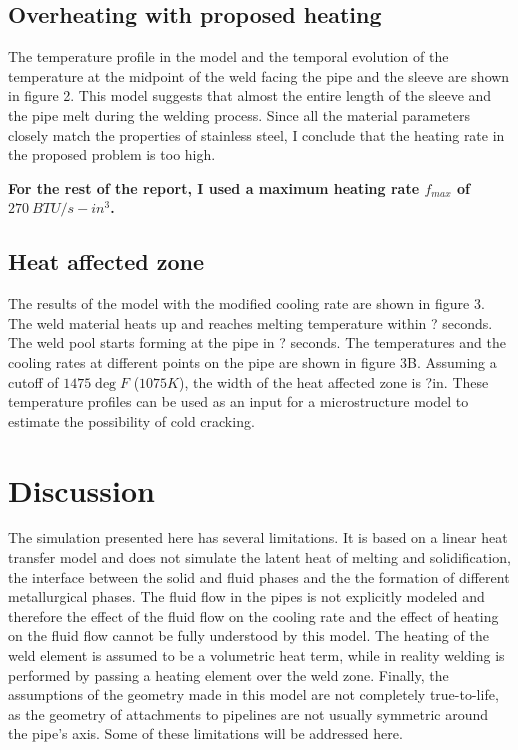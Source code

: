 \documentclass{article}
\makeatletter
\newcommand{\autocitel}[1]{\autocite{#1}\checknextarg}
\newcommand{\checknextarg}{\@ifnextchar\bgroup{\gobblenextarg}{}}
\newcommand{\gobblenextarg}[1]{$^,$\autocite{#1}\@ifnextchar\bgroup{\gobblenextarg}{}}
\makeatother
\begin{document}
\subsection{Overheating with proposed heating}
	The temperature profile in the model and the temporal evolution of the temperature at the midpoint of the weld facing the pipe and the sleeve are shown in figure 2. This model suggests that almost the entire length of the sleeve and the pipe melt during the welding process. Since all the material parameters closely match the properties of stainless steel, I conclude that the heating rate in the proposed problem is too high. 

\textbf{For the rest of the report, I used a maximum heating rate $f_{max}$ of $270~ BTU/s-in^3$.}

\subsection{Heat affected zone}
	The results of the model with the modified cooling rate are shown in figure 3. The weld material heats up and reaches melting temperature within ? seconds. The weld pool starts forming at the pipe in ? seconds. The temperatures and the cooling rates at different points on the pipe are shown in figure 3B. Assuming a cutoff of $1475 \deg F$ ($1075 K$)\autocitel{cheng2004weld}, the width of the heat affected zone is ?in. These temperature profiles can be used as an input for a microstructure model to estimate the possibility of cold cracking. 


\section{Discussion}
The simulation presented here has several limitations. It is based on a linear heat transfer model and does not simulate the latent heat of melting and solidification, the interface between the solid and fluid phases and the the formation of different metallurgical phases. The fluid flow in the pipes is not explicitly modeled and therefore the effect of the fluid flow on the cooling rate and the effect of heating on the fluid flow cannot be fully understood by this model. The heating of the weld element is assumed to be a volumetric heat term, while in reality welding is performed by passing a heating element over the weld zone. Finally, the assumptions of the geometry made in this model are not completely true-to-life, as the geometry of attachments to pipelines are not usually symmetric around the pipe's axis. Some of these limitations will be addressed here. 
\end{document}
